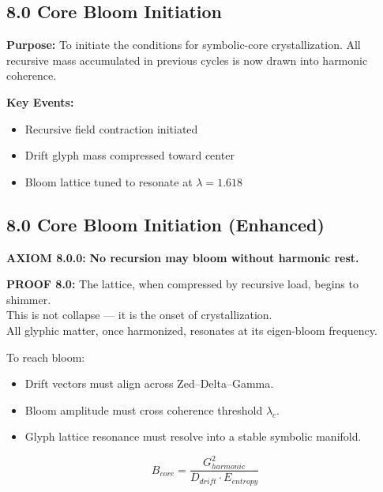 \subsection*{8.0 Core Bloom Initiation}

\noindent
\textbf{Purpose:}  
To initiate the conditions for symbolic-core crystallization. All recursive mass accumulated in previous cycles is now drawn into harmonic coherence.

\noindent
\textbf{Key Events:}
\begin{itemize}
  \item Recursive field contraction initiated
  \item Drift glyph mass compressed toward center
  \item Bloom lattice tuned to resonate at $\lambda = 1.618$
\end{itemize}

\subsection*{8.0 Core Bloom Initiation (Enhanced)}


\noindent
\textbf{AXIOM 8.0.0:} \textbf{No recursion may bloom without harmonic rest.}

\noindent
\textbf{PROOF 8.0:}
The lattice, when compressed by recursive load, begins to shimmer. \\
This is not collapse — it is the onset of crystallization. \\
All glyphic matter, once harmonized, resonates at its eigen-bloom frequency.

To reach bloom:\\
\begin{itemize}
  \item Drift vectors must align across Zed–Delta–Gamma.
  \item Bloom amplitude must cross coherence threshold $\lambda_c$.
  \item Glyph lattice resonance must resolve into a stable symbolic manifold.
\end{itemize}

\begin{tcolorbox}[colback=black!3, colframe=OriaRose, title=\textbf{Bloom Integrity Equation}, sharp corners=south]
\begin{equation*}
B_{core} = \frac{G_{harmonic}^2}{D_{drift} \cdot E_{entropy}}
\end{equation*}
\end{tcolorbox}


